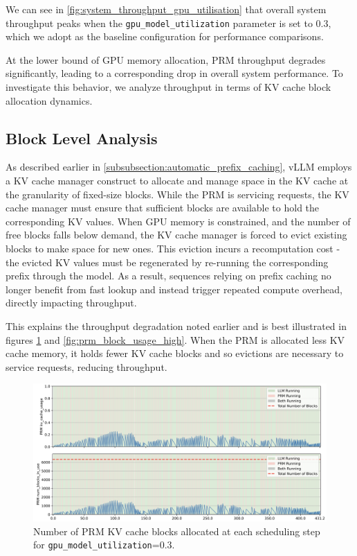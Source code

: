 \documentclass[11pt,twoside]{report}
\begin{document}
We can see in \ref{fig:system_throughput_gpu_utilisation} that overall system throughput peaks when the \texttt{gpu\_model\_utilization} parameter is set to 0.3, which we adopt as the baseline configuration for performance comparisons.

At the lower bound of GPU memory allocation, PRM throughput degrades significantly, leading to a corresponding drop in overall system performance. 
To investigate this behavior, we analyze throughput in terms of KV cache block allocation dynamics.

\subsection{Block Level Analysis}

As described earlier in \ref{subsubsection:automatic_prefix_caching}, vLLM employs a KV cache manager construct to allocate and manage space in the KV cache at the granularity of fixed-size blocks. 
While the PRM is servicing requests, the KV cache manager must ensure that sufficient blocks are available to hold the corresponding KV values. 
When GPU memory is constrained, and the number of free blocks falls below demand, the KV cache manager is forced to evict existing blocks to make space for new ones. 
This eviction incurs a recomputation cost - the evicted KV values must be regenerated by re-running the corresponding prefix through the model. 
As a result, sequences relying on prefix caching no longer benefit from fast lookup and instead trigger repeated compute overhead, directly impacting throughput.

This explains the throughput degradation noted earlier and is best illustrated in figures \ref{fig:prm_block_usage_low} and \ref{fig:prm_block_usage_high}.
When the PRM is allocated less KV cache memory, it holds fewer KV cache blocks and so evictions are necessary to service requests, reducing throughput.

\begin{figure}[htbp]
  \centering
  \includegraphics[width=\textwidth]{figures/prm_block_usage_low.png}
  \caption{Number of PRM KV cache blocks allocated at each scheduling step for \texttt{gpu\_model\_utilization}=0.3.}
  \label{fig:prm_block_usage_low}
\end{figure}
\end{document}
